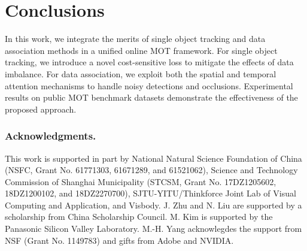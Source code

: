\documentclass[runningheads]{llncs}
\begin{document}
\section{Conclusions}
In this work, we integrate the merits of single object tracking and data association methods in a unified online MOT framework. 
For single object tracking, we introduce a novel cost-sensitive loss to mitigate the effects of data imbalance. 
For data association, we exploit both the spatial and temporal attention mechanisms to handle noisy detections and occlusions. 
Experimental results on public MOT benchmark datasets demonstrate the effectiveness of the proposed approach.
  
  \subsubsection{Acknowledgments.}
  This work is supported in part by National Natural Science Foundation of China (NSFC, Grant No. 61771303, 61671289, and 61521062), Science and Technology Commission of Shanghai Municipality (STCSM, Grant No. 17DZ1205602, 18DZ1200102, and 18DZ2270700), SJTU-YITU/Thinkforce Joint Lab of Visual Computing and Application, and Visbody. J. Zhu and N. Liu are supported by a scholarship from China Scholarship Council. M. Kim is supported by the Panasonic Silicon Valley Laboratory. M.-H. Yang acknowlegdes the support from NSF (Grant No. 1149783) and gifts from Adobe and NVIDIA. 
  \clearpage
  
  
  
  
\end{document}
